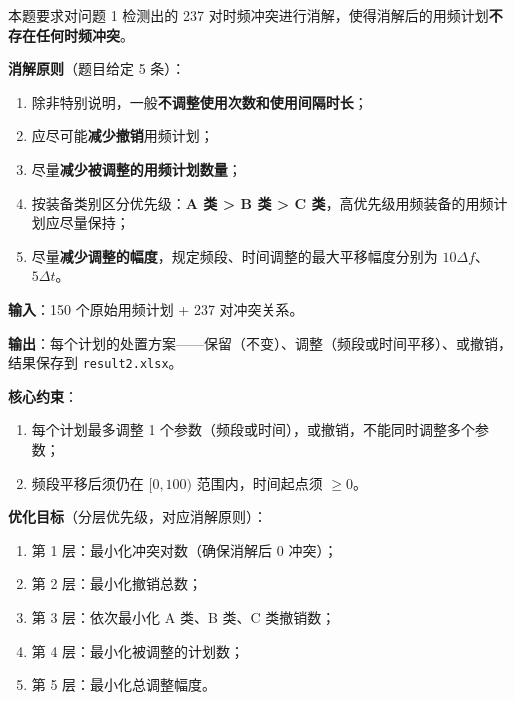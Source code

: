 
本题要求对问题 1 检测出的 237 对时频冲突进行消解，使得消解后的用频计划\textbf{不存在任何时频冲突}。

\textbf{消解原则}（题目给定 5 条）：
\begin{enumerate}
    \item 除非特别说明，一般\textbf{不调整使用次数和使用间隔时长}；
    \item 应尽可能\textbf{减少撤销}用频计划；
    \item 尽量\textbf{减少被调整的用频计划数量}；
    \item 按装备类别区分优先级：\textbf{A 类 > B 类 > C 类}，高优先级用频装备的用频计划应尽量保持；
    \item 尽量\textbf{减少调整的幅度}，规定频段、时间调整的最大平移幅度分别为 $10\Delta f$、$5\Delta t$。
\end{enumerate}

\textbf{输入}：150 个原始用频计划 + 237 对冲突关系。

\textbf{输出}：每个计划的处置方案——保留（不变）、调整（频段或时间平移）、或撤销，结果保存到 \texttt{result2.xlsx}。

\textbf{核心约束}：
\begin{enumerate}
    \item 每个计划最多调整 1 个参数（频段或时间），或撤销，不能同时调整多个参数；
    \item 频段平移后须仍在 $[0, 100)$ 范围内，时间起点须 $\geq 0$。
\end{enumerate}

\textbf{优化目标}（分层优先级，对应消解原则）：
\begin{enumerate}
    \item 第 1 层：最小化冲突对数（确保消解后 0 冲突）；
    \item 第 2 层：最小化撤销总数；
    \item 第 3 层：依次最小化 A 类、B 类、C 类撤销数；
    \item 第 4 层：最小化被调整的计划数；
    \item 第 5 层：最小化总调整幅度。
\end{enumerate}
